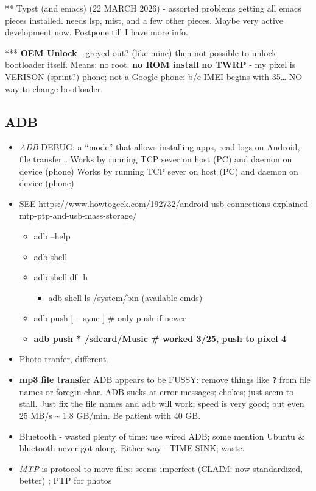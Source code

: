 \documentclass[
]{report}
\providecommand{\tightlist}{%
  \setlength{\itemsep}{0pt}\setlength{\parskip}{0pt}}\usepackage{longtable,booktabs,array}
\begin{document}
** Typst (and emacs) (22 MARCH 2026) - assorted problems getting all
emacs pieces installed. needs lsp, mist, and a few other pieces. Maybe
very active development now. Postpone till I have more info.

*** \textbf{OEM Unlock} - greyed out? (like mine) then not possible to
unlock bootloader itself. Means: no root. \textbf{no ROM install}
\textbf{no TWRP} - my pixel is VERISON (sprint?) phone; not a Google
phone; b/c IMEI begins with 35\ldots{} NO way to change bootloader.

\subsection{ADB}\label{adb}

\begin{itemize}
\item
  \emph{ADB} DEBUG: a ``mode'' that allows installing apps, read logs on
  Android, file transfer\ldots{} Works by running TCP sever on host (PC)
  and daemon on device (phone) Works by running TCP sever on host (PC)
  and daemon on device (phone)
\item
  SEE
  https://www.howtogeek.com/192732/android-usb-connections-explained-mtp-ptp-and-usb-mass-storage/

  \begin{itemize}
  \tightlist
  \item
    adb --help
  \item
    adb shell
  \item
    adb shell df -h

    \begin{itemize}
    \tightlist
    \item
      adb shell ls /system/bin (available cmds)
    \end{itemize}
  \item
    adb push {[} -- sync {]} \# only push if newer
  \item
    \textbf{adb push * /sdcard/Music \# worked 3/25, push to pixel 4}
  \end{itemize}
\item
  Photo tranfer, different.
\item
  \textbf{mp3 file transfer} ADB appears to be FUSSY: remove things like
  \texttt{?} from file names or foregin char. ADB sucks at error
  messages; chokes; just seem to stall. Just fix the file names and adb
  will work; speed is very good; but even 25 MB/s \textasciitilde{} 1.8
  GB/min. Be patient with 40 GB.
\item
  Bluetooth - wasted plenty of time: use wired ADB; some mention Ubuntu
  \& bluetooth never got along. Either way - TIME SINK; waste.
\item
  \emph{MTP} is protocol to move files; seems imperfect (CLAIM: now
  standardized, better) ; PTP for photos
\end{itemize}
\end{document}
